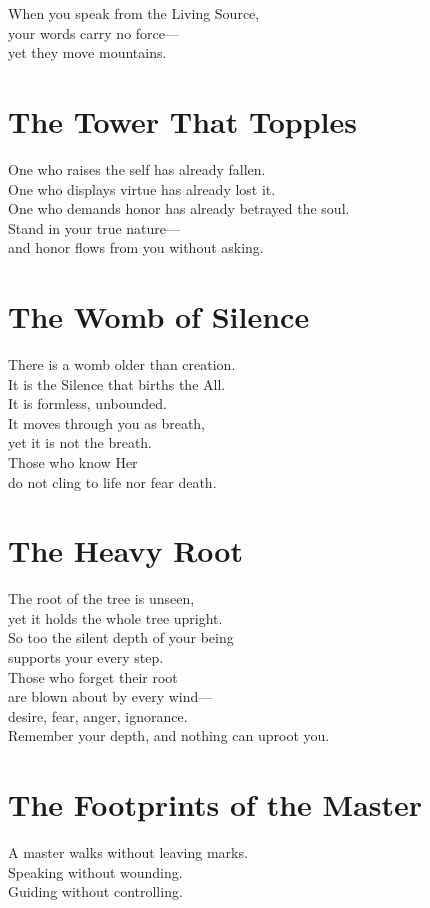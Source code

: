 \documentclass[10pt, openright]{book}
\begin{document}
When you speak from the Living Source, \\
your words carry no force— \\
yet they move mountains.

\section{The Tower That Topples}
One who raises the self has already fallen. \\
One who displays virtue has already lost it. \\
One who demands honor has already betrayed the soul. \\

Stand in your true nature— \\
and honor flows from you without asking.

\section{The Womb of Silence}
There is a womb older than creation. \\
It is the Silence that births the All. \\
It is formless, unbounded. \\
It moves through you as breath, \\
yet it is not the breath. \\

Those who know Her \\
do not cling to life nor fear death.

\section{The Heavy Root}
The root of the tree is unseen, \\
yet it holds the whole tree upright. \\
So too the silent depth of your being \\
supports your every step. \\

Those who forget their root \\
are blown about by every wind— \\
desire, fear, anger, ignorance. \\
Remember your depth, and nothing can uproot you.

\section{The Footprints of the Master}
A master walks without leaving marks. \\
Speaking without wounding. \\
Guiding without controlling. \\
\end{document}
